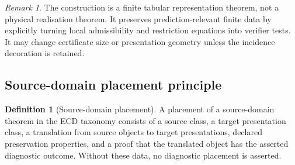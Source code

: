 \documentclass[11pt]{article}
\theoremstyle{plain}
\theoremstyle{definition}
\newtheorem{definition}[theorem]{Definition}
\theoremstyle{remark}
\newtheorem{remark}[theorem]{Remark}
\begin{document}
\begin{remark}
The construction is a finite tabular representation theorem, not a physical
realisation theorem. It preserves prediction-relevant finite data by explicitly
turning local admissibility and restriction equations into verifier tests. It may
change certificate size or presentation geometry unless the incidence decoration
is retained.
\end{remark}

\subsection{Source-domain placement principle}

\begin{definition}[Source-domain placement]
\label{def:source-domain-placement}
A placement of a source-domain theorem in the ECD taxonomy consists of a source
class, a target presentation class, a translation from source objects to target
presentations, declared preservation properties, and a proof that the translated
object has the asserted diagnostic outcome. Without these data, no diagnostic
placement is asserted.
\end{definition}
\end{document}

